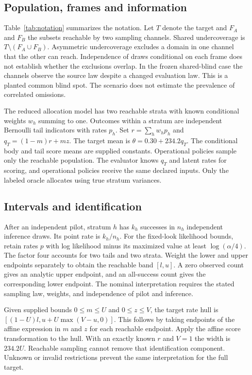 \documentclass[article,nojss]{jss}
\begin{document}
\subsection{Population, frames and information}

Table~\ref{tab:notation} summarizes the notation. Let \(T\) denote the target and \(F_A\) and \(F_B\) the subsets reachable by
two sampling channels. Shared undercoverage is \(T\setminus(F_A\cup
F_B)\). Asymmetric undercoverage excludes a domain in one channel that
the other can reach. Independence of draws conditional on each frame does not establish
whether the exclusions overlap. In the frozen
shared-blind case the channels observe the source law despite a changed
evaluation law. This is a planted common blind spot. The scenario does
not estimate the prevalence of correlated omissions.

The reduced allocation model has two reachable strata with known
conditional weights \(w_h\) summing to one. Outcomes within a stratum
are independent Bernoulli tail indicators with rates \(p_h\). Set
\(r=\sum_h w_h p_h\) and \(q_T=(1-m)r+mz\). The target mean is
\(\theta=0.30+234.2q_T\). The conditional body and tail score means are
supplied constants. Operational policies sample only the reachable population. The
evaluator knows \(q_T\) and latent rates for scoring, and operational
policies receive the same declared inputs. Only the labeled oracle
allocates using true stratum variances.

\subsection{Intervals and identification}

After an independent pilot, stratum \(h\) has \(k_h\) successes in \(n_h\)
independent inference draws. Its point rate is \(k_h/n_h\). For the
fixed-look likelihood bounds, retain rates \(p\) with log likelihood minus
its maximized value at least \(\log(\alpha/4)\). The factor four
accounts for two tails and two strata. Weight the lower and upper
endpoints separately to obtain the reachable band \([l,u]\). A zero
observed count gives an analytic upper endpoint, and an all-success
count gives the corresponding lower endpoint. The nominal interpretation
requires the stated sampling law, weights, and independence of pilot and
inference.

Given supplied bounds \(0\leq m\leq U\) and \(0\leq z\leq V\), the
target rate hull is \([(1-U)l,u+U\max(V-u,0)]\). This follows by taking
endpoints of the affine expression in \(m\) and \(z\) for each reachable
endpoint. Apply the affine score transformation to the hull. With an
exactly known \(r\) and \(V=1\) the width is \(234.2U\). Reachable sampling
cannot remove that identification component. Unknown or invalid
restrictions prevent the same interpretation for the full target.
\end{document}

